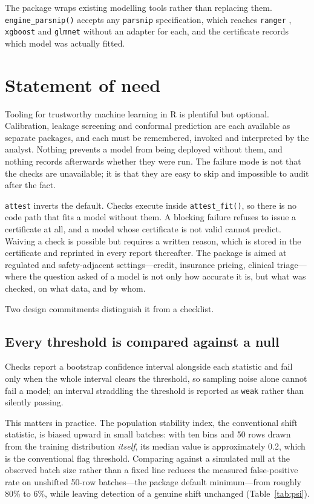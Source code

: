 \documentclass[11pt,a4paper]{article}
\begin{document}
The package wraps existing modelling tools rather than replacing them.
\texttt{engine\_parsnip()} accepts any \texttt{parsnip} \citep{parsnip}
specification, which reaches \texttt{ranger} \citep{ranger}, \texttt{xgboost}
and \texttt{glmnet} without an adapter for each, and the certificate records
which model was actually fitted.

\section{Statement of need}

Tooling for trustworthy machine learning in \textsf{R} is plentiful but
optional. Calibration, leakage screening and conformal prediction are each
available as separate packages, and each must be remembered, invoked and
interpreted by the analyst. Nothing prevents a model from being deployed
without them, and nothing records afterwards whether they were run. The failure
mode is not that the checks are unavailable; it is that they are easy to skip
and impossible to audit after the fact.

\texttt{attest} inverts the default. Checks execute inside
\texttt{attest\_fit()}, so there is no code path that fits a model without
them. A blocking failure refuses to issue a certificate at all, and a model
whose certificate is not valid cannot predict. Waiving a check is possible but
requires a written reason, which is stored in the certificate and reprinted in
every report thereafter. The package is aimed at regulated and safety-adjacent
settings---credit, insurance pricing, clinical triage---where the question
asked of a model is not only how accurate it is, but what was checked, on what
data, and by whom.

Two design commitments distinguish it from a checklist.

\subsection{Every threshold is compared against a null}

Checks report a bootstrap confidence interval alongside each statistic and fail
only when the whole interval clears the threshold, so sampling noise alone
cannot fail a model; an interval straddling the threshold is reported as
\texttt{weak} rather than silently passing.

This matters in practice. The population stability index, the conventional
shift statistic, is biased upward in small batches: with ten bins and 50 rows
drawn from the training distribution \emph{itself}, its median value is
approximately 0.2, which is the conventional flag threshold. Comparing against
a simulated null at the observed batch size rather than a fixed line reduces
the measured false-positive rate on unshifted 50-row batches---the package
default minimum---from roughly 80\% to 6\%, while leaving detection of a
genuine shift unchanged (Table~\ref{tab:psi}).
\end{document}
